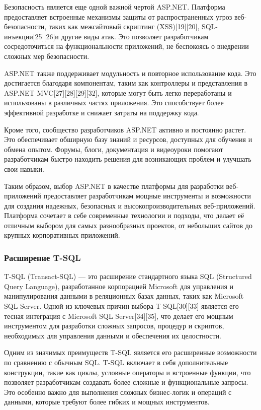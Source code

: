 Безопасность является еще одной важной чертой ASP.NET. Платформа предоставляет встроенные механизмы защиты от распространенных угроз веб-безопасности, таких как межсайтовый скриптинг (XSS)[{19}][{20}], SQL-инъекции[{25}][{26}]и другие виды атак. Это позволяет разработчикам сосредоточиться на функциональности приложений, не беспокоясь о внедрении сложных мер безопасности.

ASP.NET также поддерживает модульность и повторное использование кода. Это достигается благодаря компонентам, таким как контроллеры и представления в ASP.NET MVC[{27}][{28}][{29}][{32}], которые могут быть легко переработаны и использованы в различных частях приложения. Это способствует более эффективной разработке и снижает затраты на поддержку кода.

Кроме того, сообщество разработчиков ASP.NET активно и постоянно растет. Это обеспечивает обширную базу знаний и ресурсов, доступных для обучения и обмена опытом. Форумы, блоги, документация и видеоуроки помогают разработчикам быстро находить решения для возникающих проблем и улучшать свои навыки.

Таким образом, выбор ASP.NET в качестве платформы для разработки веб-приложений предоставляет разработчикам мощные инструменты и возможности для создания надежных, безопасных и высокопроизводительных веб-приложений. Платформа сочетает в себе современные технологии и подходы, что делает её отличным выбором для самых разнообразных проектов, от небольших сайтов до крупных корпоративных приложений.

\subsubsection{Расширение T-SQL}

T-SQL (Transact-SQL) — это расширение стандартного языка SQL (Structured Query Language), разработанное корпорацией Microsoft для управления и манипулирования данными в реляционных базах данных, таких как Microsoft SQL Server. Одной из ключевых причин выбора T-SQL{[30]}{[33]} является его тесная интеграция с Microsoft SQL Server{[34]}{[35]}, что делает его мощным инструментом для разработки сложных запросов, процедур и скриптов, необходимых для управления данными и обеспечения их целостности.

Одним из значимых преимуществ T-SQL является его расширенные возможности по сравнению с обычным SQL. T-SQL включает в себя дополнительные конструкции, такие как циклы, условные операторы и встроенные функции, что позволяет разработчикам создавать более сложные и функциональные запросы. Это особенно важно для выполнения сложных бизнес-логик и операций с данными, которые требуют более гибких и мощных инструментов.

